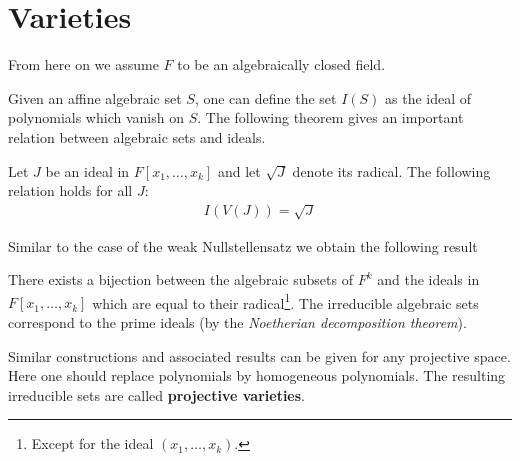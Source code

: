 \section{Varieties}

	From here on we assume $F$ to be an algebraically closed field.

	
	Given an affine algebraic set $S$, one can define the set $I(S)$ as the ideal of polynomials which vanish on $S$. The following theorem gives an important relation between algebraic sets and ideals.
	\begin{theorem}
		Let $J$ be an ideal in $F[x_1, \ldots, x_k]$ and let $\sqrt{J}$ denote its radical. The following relation holds for all $J$:
		\begin{gather}
			I(V(J)) = \sqrt{J}
		\end{gather}
	\end{theorem}
	Similar to the case of the weak Nullstellensatz we obtain the following result
	\begin{result}
		There exists a bijection between the algebraic subsets of $F^k$ and the ideals in $F[x_1, \ldots, x_k]$ which are equal to their radical\footnote{Except for the ideal $(x_1, \ldots, x_k)$.}. The irreducible algebraic sets correspond to the prime ideals (by the \textit{Noetherian decomposition theorem}).
	\end{result}
	
	\begin{remark}
		Similar constructions and associated results can be given for any projective space. Here one should replace polynomials by homogeneous polynomials. The resulting irreducible sets are called \textbf{projective varieties}.
	\end{remark}
	
